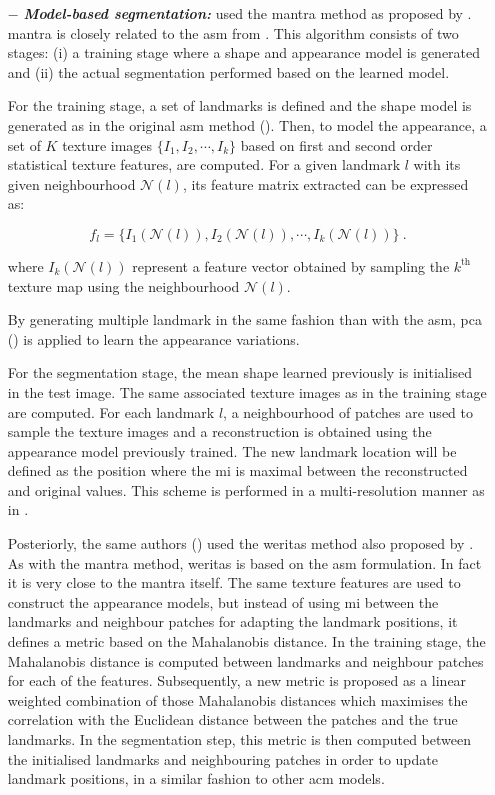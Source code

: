 \begin{enumerate}[leftmargin=*]
\item[$-$] \textbf{\textit{Model-based segmentation:}} \cite{Viswanath2008a,Viswanath2009} used the \ac{mantra} method as proposed by \cite{Toth2008}. \ac{mantra} is closely related to the \ac{asm} from \cite{Cootes1995}. This algorithm consists of two stages: (i) a training stage where a shape and appearance model is generated and (ii) the actual segmentation performed based on the learned model. 

For the training stage, a set of landmarks is defined and the shape model is generated as in the original \ac{asm} method (\cite{Cootes1995}). Then, to model the appearance, a set of $K$ texture images $\{I_1,I_2,\cdots,I_k\}$ based on first and second order statistical texture features, are computed. For a given landmark $l$ with its given neighbourhood $\mathcal{N}(l)$, its feature matrix extracted can be expressed as:

\begin{equation}
	f_l = \{ I_1(\mathcal{N}(l)), I_2(\mathcal{N}(l)), \cdots, I_k(\mathcal{N}(l)) \} \ .	
	\label{eq:mantra1}
\end{equation}

\noindent where $I_k(\mathcal{N}(l))$ represent a feature vector obtained by sampling the $k^{\text{th}}$ texture map using the neighbourhood $\mathcal{N}(l)$.

By generating multiple landmark in the same fashion than with the \ac{asm}, \ac{pca} (\cite{Pearson1901}) is applied to learn the appearance variations. 

For the segmentation stage, the mean shape learned previously is initialised in the test image. The same associated texture images as in the training stage are computed. For each landmark $l$, a neighbourhood of patches are used to sample the texture images and a reconstruction is obtained using the appearance model previously trained. The new landmark location will be defined as the position where the \ac{mi} is maximal between the reconstructed and original values. This scheme is performed in a multi-resolution manner as in \cite{Cootes1995}.

Posteriorly, the same authors (\cite{Viswanath2012}) used the \ac{weritas} method also proposed by \cite{Toth2009}. As with the \ac{mantra} method, \ac{weritas} is based on the \ac{asm} formulation. In fact it is very close to the \ac{mantra} itself. The same texture features are used to construct the appearance models, but instead of using \ac{mi} between the landmarks and neighbour patches for adapting the landmark positions, it defines a metric based on the Mahalanobis distance. In the training stage, the Mahalanobis distance is computed between landmarks and neighbour patches for each of the features. Subsequently, a new metric is proposed as a linear weighted combination of those Mahalanobis distances which maximises the correlation with the Euclidean distance between the patches and the true landmarks. In the segmentation step, this metric is then computed between the initialised landmarks and neighbouring patches in order to update landmark positions, in a similar fashion to other \ac{acm} models. 


\end{enumerate}
